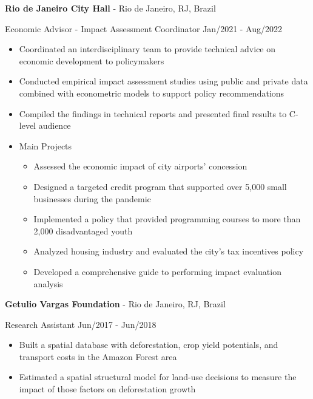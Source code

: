 \documentclass[11pt]{article}
\newenvironment{lonelist}[1][\enskip\textbullet]%
	{\begin{list}{#1}{%
				\setlength{\partopsep}{0pt}%
				\setlength{\topsep}{0pt}}}
		{\end{list}\vspace{-.6\baselineskip}}
\newenvironment{innerlist}[1][\enskip\textbullet]%
	{\begin{itemize}[#1,leftmargin=*,parsep=0pt,itemsep=0pt,topsep=0pt,partopsep=0pt]}
		{\end{itemize}}
\begin{document}
		\begin{lonelist}
			\item[] \textbf {Rio de Janeiro City Hall} - Rio de Janeiro, RJ, Brazil
			\item[] Economic Advisor - Impact Assessment Coordinator  \hfill Jan/2021 - Aug/2022
			\begin{innerlist}
				\item  Coordinated an interdisciplinary team to provide technical advice on economic development to policymakers
				\vspace{.05in}
				\item Conducted empirical impact assessment studies using public and private data combined with econometric models to support policy recommendations
				\vspace{.05in}
				\item Compiled the findings in technical reports and presented final results to C-level audience
				\vspace{.05in}
				\item Main Projects
				\begin{itemize}
					\item Assessed the economic impact of city airports' concession
					\item Designed a targeted credit program that supported over 5,000 small businesses during the pandemic
					\item Implemented a policy that provided programming courses to more than 2,000 disadvantaged youth
					\item Analyzed housing industry and evaluated the city's tax incentives policy
					\item Developed a comprehensive guide to performing impact evaluation analysis
				\end{itemize}
			\end{innerlist}
		\end{lonelist}
		\vspace{.3in}
		\begin{lonelist}
			\item[] \textbf{Getulio Vargas Foundation} - Rio de Janeiro, RJ, Brazil  
			\item[] Research Assistant  \hfill Jun/2017 - Jun/2018
			\begin{innerlist}
				\item Built a spatial database with deforestation, crop yield potentials, and transport costs in the Amazon Forest area
				\vspace{.05in}
				\item Estimated a spatial structural model for land-use decisions to measure the impact of those factors on deforestation growth
			\end{innerlist}
		\end{lonelist}
		\vspace{.3in}
		
\end{document}

